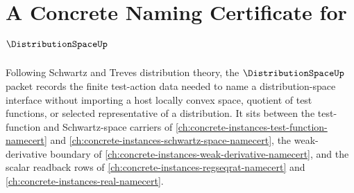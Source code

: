 \chapter{A Concrete Naming Certificate for $\DistributionSpaceUp$}
\label{ch:concrete-instances-distribution-space-namecert}

Following Schwartz and Treves distribution theory, the $\DistributionSpaceUp$ packet records the finite test-action data needed to name a distribution-space interface without importing a host locally convex space, quotient of test functions, or selected representative of a distribution. It sits between the test-function and Schwartz-space carriers of \autoref{ch:concrete-instances-test-function-namecert} and \autoref{ch:concrete-instances-schwartz-space-namecert}, the weak-derivative boundary of \autoref{ch:concrete-instances-weak-derivative-namecert}, and the scalar readback rows of \autoref{ch:concrete-instances-regseqrat-namecert} and \autoref{ch:concrete-instances-real-namecert}.


